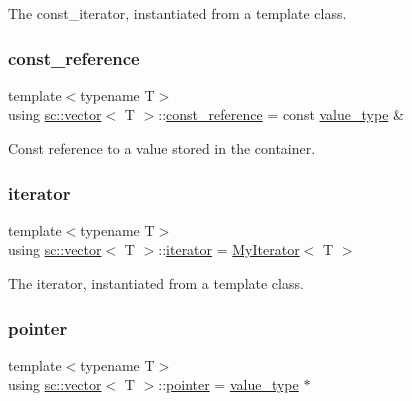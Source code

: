 The const\+\_\+iterator, instantiated from a template class. 

\mbox{\label{classsc_1_1vector_a8da2b1a11b069241100f9b2e14f481a0}} 
\subsubsection{\texorpdfstring{const\+\_\+reference}{const\_reference}}
{\footnotesize\ttfamily template$<$typename T$>$ \\
using \hyperlink{classsc_1_1vector}{sc\+::vector}$<$ T $>$\+::\hyperlink{classsc_1_1vector_a8da2b1a11b069241100f9b2e14f481a0}{const\+\_\+reference} =  const \hyperlink{classsc_1_1vector_ad37f5bfa688e43c420ed565e4bff6fac}{value\+\_\+type} \&}



Const reference to a value stored in the container. 

\mbox{\label{classsc_1_1vector_a9e5d5cc35e379aa27a93989f4a71413c}} 
\subsubsection{\texorpdfstring{iterator}{iterator}}
{\footnotesize\ttfamily template$<$typename T$>$ \\
using \hyperlink{classsc_1_1vector}{sc\+::vector}$<$ T $>$\+::\hyperlink{classsc_1_1vector_a9e5d5cc35e379aa27a93989f4a71413c}{iterator} =  \hyperlink{classsc_1_1MyIterator}{My\+Iterator}$<$ T $>$}



The iterator, instantiated from a template class. 

\mbox{\label{classsc_1_1vector_a0348a6e1e249e051964a2bc94b05527a}} 
\subsubsection{\texorpdfstring{pointer}{pointer}}
{\footnotesize\ttfamily template$<$typename T$>$ \\
using \hyperlink{classsc_1_1vector}{sc\+::vector}$<$ T $>$\+::\hyperlink{classsc_1_1vector_a0348a6e1e249e051964a2bc94b05527a}{pointer} =  \hyperlink{classsc_1_1vector_ad37f5bfa688e43c420ed565e4bff6fac}{value\+\_\+type} $\ast$}



